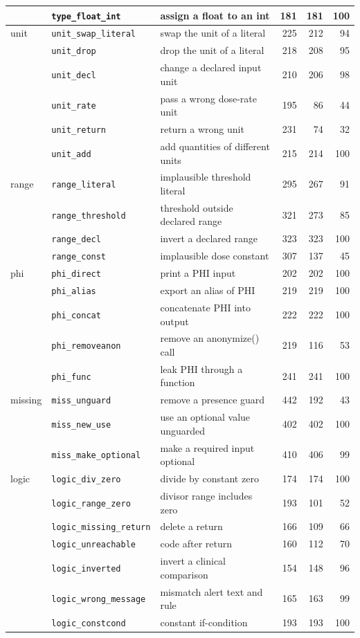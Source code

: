 \begin{longtable}{llp{5.2cm}rrr}
 & \texttt{type\_float\_int} & assign a float to an int & 181 & 181 & 100\\
\midrule
unit & \texttt{unit\_swap\_literal} & swap the unit of a literal & 225 & 212 & 94\\
 & \texttt{unit\_drop} & drop the unit of a literal & 218 & 208 & 95\\
 & \texttt{unit\_decl} & change a declared input unit & 210 & 206 & 98\\
 & \texttt{unit\_rate} & pass a wrong dose-rate unit & 195 & 86 & 44\\
 & \texttt{unit\_return} & return a wrong unit & 231 & 74 & 32\\
 & \texttt{unit\_add} & add quantities of different units & 215 & 214 & 100\\
\midrule
range & \texttt{range\_literal} & implausible threshold literal & 295 & 267 & 91\\
 & \texttt{range\_threshold} & threshold outside declared range & 321 & 273 & 85\\
 & \texttt{range\_decl} & invert a declared range & 323 & 323 & 100\\
 & \texttt{range\_const} & implausible dose constant & 307 & 137 & 45\\
\midrule
phi & \texttt{phi\_direct} & print a PHI input & 202 & 202 & 100\\
 & \texttt{phi\_alias} & export an alias of PHI & 219 & 219 & 100\\
 & \texttt{phi\_concat} & concatenate PHI into output & 222 & 222 & 100\\
 & \texttt{phi\_removeanon} & remove an anonymize() call & 219 & 116 & 53\\
 & \texttt{phi\_func} & leak PHI through a function & 241 & 241 & 100\\
\midrule
missing & \texttt{miss\_unguard} & remove a presence guard & 442 & 192 & 43\\
 & \texttt{miss\_new\_use} & use an optional value unguarded & 402 & 402 & 100\\
 & \texttt{miss\_make\_optional} & make a required input optional & 410 & 406 & 99\\
\midrule
logic & \texttt{logic\_div\_zero} & divide by constant zero & 174 & 174 & 100\\
 & \texttt{logic\_range\_zero} & divisor range includes zero & 193 & 101 & 52\\
 & \texttt{logic\_missing\_return} & delete a return & 166 & 109 & 66\\
 & \texttt{logic\_unreachable} & code after return & 160 & 112 & 70\\
 & \texttt{logic\_inverted} & invert a clinical comparison & 154 & 148 & 96\\
 & \texttt{logic\_wrong\_message} & mismatch alert text and rule & 165 & 163 & 99\\
 & \texttt{logic\_constcond} & constant if-condition & 193 & 193 & 100\\
\bottomrule
\end{longtable}
